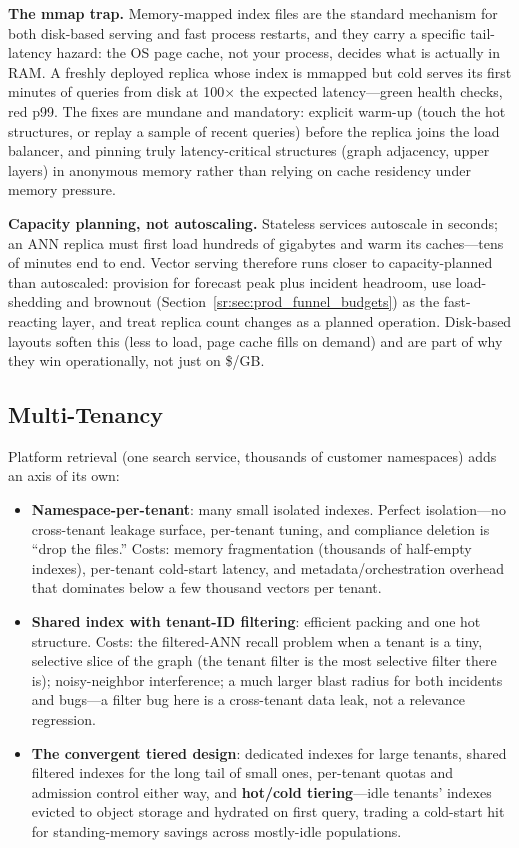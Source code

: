 \textbf{The mmap trap.} Memory-mapped index files are the standard mechanism for both disk-based serving and fast process restarts, and they carry a specific tail-latency hazard: the OS page cache, not your process, decides what is actually in RAM. A freshly deployed replica whose index is mmapped but cold serves its first minutes of queries from disk at 100$\times$ the expected latency---green health checks, red p99. The fixes are mundane and mandatory: explicit warm-up (touch the hot structures, or replay a sample of recent queries) before the replica joins the load balancer, and pinning truly latency-critical structures (graph adjacency, upper layers) in anonymous memory rather than relying on cache residency under memory pressure.

\textbf{Capacity planning, not autoscaling.} Stateless services autoscale in seconds; an ANN replica must first load hundreds of gigabytes and warm its caches---tens of minutes end to end. Vector serving therefore runs closer to capacity-planned than autoscaled: provision for forecast peak plus incident headroom, use load-shedding and brownout (Section~\ref{sr:sec:prod_funnel_budgets}) as the fast-reacting layer, and treat replica count changes as a planned operation. Disk-based layouts soften this (less to load, page cache fills on demand) and are part of why they win operationally, not just on \$/GB.

\subsection{Multi-Tenancy}

Platform retrieval (one search service, thousands of customer namespaces) adds an axis of its own:

\begin{itemize}
    \item \textbf{Namespace-per-tenant}: many small isolated indexes. Perfect isolation---no cross-tenant leakage surface, per-tenant tuning, and compliance deletion is ``drop the files.'' Costs: memory fragmentation (thousands of half-empty indexes), per-tenant cold-start latency, and metadata/orchestration overhead that dominates below a few thousand vectors per tenant.
    \item \textbf{Shared index with tenant-ID filtering}: efficient packing and one hot structure. Costs: the filtered-ANN recall problem when a tenant is a tiny, selective slice of the graph (the tenant filter is the most selective filter there is); noisy-neighbor interference; a much larger blast radius for both incidents and bugs---a filter bug here is a cross-tenant data leak, not a relevance regression.
    \item \textbf{The convergent tiered design}: dedicated indexes for large tenants, shared filtered indexes for the long tail of small ones, per-tenant quotas and admission control either way, and \textbf{hot/cold tiering}---idle tenants' indexes evicted to object storage and hydrated on first query, trading a cold-start hit for standing-memory savings across mostly-idle populations.
\end{itemize}

